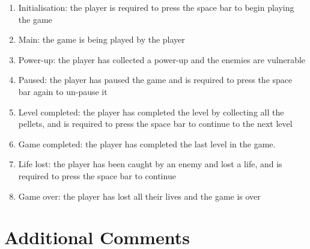 \documentclass[a4paper,11pt]{article}
\begin{document}
    \begin{enumerate}
        \item Initialisation: the player is required to press the space bar to
            begin playing the game
        \item Main: the game is being played by the player
        \item Power-up: the player has collected a power-up and the enemies are
            vulnerable
        \item Paused: the player has paused the game and is required to press
            the space bar again to un-pause it
        \item Level completed: the player has completed the level by collecting
            all the pellets, and is required to press the space bar to continue
            to the next level
        \item Game completed: the player has completed the last level in the
            game.
        \item Life lost: the player has been caught by an enemy and lost
            a life, and is required to press the space bar to continue
        \item Game over: the player has lost all their lives and the game is
            over
    \end{enumerate}

    \section{Additional Comments}
\end{document}
